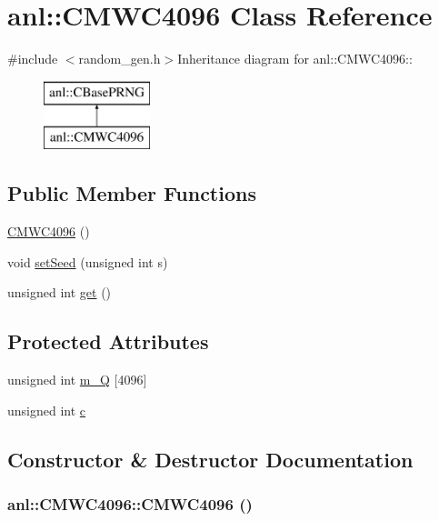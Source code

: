 \hypertarget{classanl_1_1CMWC4096}{
\section{anl::CMWC4096 Class Reference}
\label{classanl_1_1CMWC4096}
}


{\ttfamily \#include $<$random\_\-gen.h$>$}Inheritance diagram for anl::CMWC4096::\begin{figure}[H]
\begin{center}
\leavevmode
\includegraphics[height=2cm]{classanl_1_1CMWC4096}
\end{center}
\end{figure}
\subsection*{Public Member Functions}
\begin{DoxyCompactItemize}
\item 
\hyperlink{classanl_1_1CMWC4096_aee41ffb6d16a82cb385f965d71aa0f41}{CMWC4096} ()
\item 
void \hyperlink{classanl_1_1CMWC4096_a6bac258bda47aff87e640cae6145c970}{setSeed} (unsigned int s)
\item 
unsigned int \hyperlink{classanl_1_1CMWC4096_a28729ce8c6c8dab8cf551c7ddc2b751b}{get} ()
\end{DoxyCompactItemize}
\subsection*{Protected Attributes}
\begin{DoxyCompactItemize}
\item 
unsigned int \hyperlink{classanl_1_1CMWC4096_a594e1e21a870c7481a6f17ed61a72f24}{m\_\-Q} \mbox{[}4096\mbox{]}
\item 
unsigned int \hyperlink{classanl_1_1CMWC4096_a2531fc0da503077dc09feed8cb61c542}{c}
\end{DoxyCompactItemize}


\subsection{Constructor \& Destructor Documentation}
\hypertarget{classanl_1_1CMWC4096_aee41ffb6d16a82cb385f965d71aa0f41}{
\subsubsection[{CMWC4096}]{\setlength{\rightskip}{0pt plus 5cm}anl::CMWC4096::CMWC4096 ()}}
\label{classanl_1_1CMWC4096_aee41ffb6d16a82cb385f965d71aa0f41}


